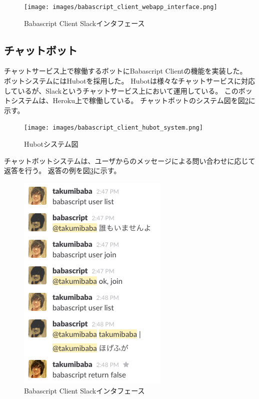 \begin{figure}[htbp]
  \begin{center}
  \texttt{[image: images/babascript\_client\_webapp\_interface.png]}
  \end{center}
  \caption{Babascript Client Slackインタフェース}
  \label{fig:babascript_client_webapp_interface}
\end{figure}

\subsection{チャットボット}\label{ux30c1ux30e3ux30c3ux30c8ux30dcux30c3ux30c8}

チャットサービス上で稼働するボットにBabascript Clientの機能を実装した。
ボットシステムにはHubotを採用した。
Hubotは様々なチャットサービスに対応しているが、Slackというチャットサービス上において運用している。
このボットシステムは、Heroku上で稼働している。
チャットボットのシステム図を図\ref{fig:babascript_client_hubot_system}に示す。

\begin{figure}[htbp]
  \begin{center}
  \texttt{[image: images/babascript\_client\_hubot\_system.png]}
  \end{center}
  \caption{Hubotシステム図}
  \label{fig:babascript_client_hubot_system}
\end{figure}

チャットボットシステムは、ユーザからのメッセージによる問い合わせに応じて返答を行う。
返答の例を図\ref{fig:babascript_client_slack}に示す。

\begin{figure}[htbp]
  \begin{center}
  \includegraphics[width=.3\linewidth,bb=0 0 273 402]{images/babascript_client_slack.png}
  \end{center}
  \caption{Babascript Client Slackインタフェース}
  \label{fig:babascript_client_slack}
\end{figure}

